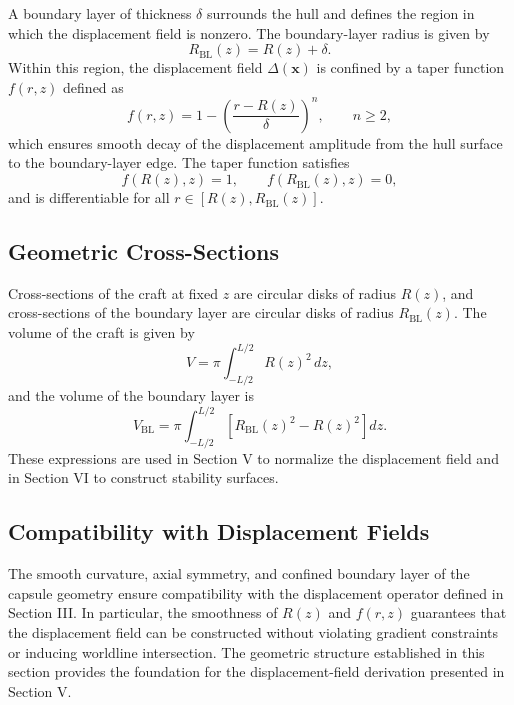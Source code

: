\documentclass[aip,adv,reprint,floatfix]{revtex4-2}
\begin{document}
A boundary layer of thickness $\delta$ surrounds the hull and defines the region in which the displacement field is nonzero. The boundary-layer radius is given by
\begin{equation}
R_{\mathrm{BL}}(z) = R(z) + \delta.
\end{equation}
Within this region, the displacement field $\Delta(\mathbf{x})$ is confined by a taper function $f(r,z)$ defined as
\begin{equation}
f(r,z) = 1 - \left( \frac{r - R(z)}{\delta} \right)^n,
\qquad
n \geq 2,
\end{equation}
which ensures smooth decay of the displacement amplitude from the hull surface to the boundary-layer edge. The taper function satisfies
\begin{equation}
f(R(z),z) = 1,
\qquad
f(R_{\mathrm{BL}}(z),z) = 0,
\end{equation}
and is differentiable for all $r \in [R(z), R_{\mathrm{BL}}(z)]$.

\subsection{Geometric Cross-Sections}

Cross-sections of the craft at fixed $z$ are circular disks of radius $R(z)$, and cross-sections of the boundary layer are circular disks of radius $R_{\mathrm{BL}}(z)$. The volume of the craft is given by
\begin{equation}
V = \pi \int_{-L/2}^{L/2} R(z)^2 \, dz,
\end{equation}
and the volume of the boundary layer is
\begin{equation}
V_{\mathrm{BL}} = \pi \int_{-L/2}^{L/2} \left[ R_{\mathrm{BL}}(z)^2 - R(z)^2 \right] dz.
\end{equation}
These expressions are used in Section V to normalize the displacement field and in Section VI to construct stability surfaces.

\subsection{Compatibility with Displacement Fields}

The smooth curvature, axial symmetry, and confined boundary layer of the capsule geometry ensure compatibility with the displacement operator defined in Section III. In particular, the smoothness of $R(z)$ and $f(r,z)$ guarantees that the displacement field can be constructed without violating gradient constraints or inducing worldline intersection. The geometric structure established in this section provides the foundation for the displacement-field derivation presented in Section V.
\end{document}
